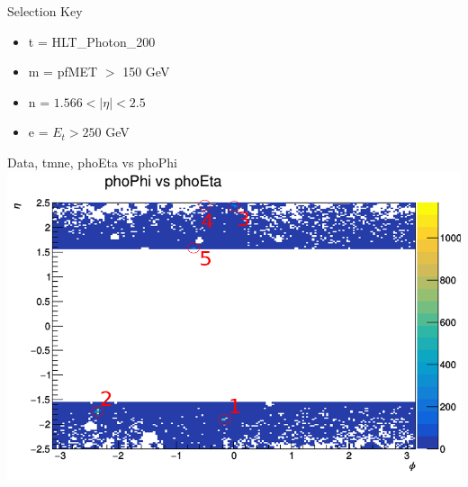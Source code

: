 \documentclass{beamer}
\author{Reese Petersen}
\institute[]{University of Minnesota \\
\medskip
\texttt{pet00831@umn.edu} %
}
\date{\today} %
\title[UMN-CMS Group Meeting]{}
\begin{document}
\begin{frame}{Selection Key}
    \begin{itemize}
        \item t = HLT\_Photon\_200
        \item m = pfMET \(>\) 150 GeV
        \item n = \(1.566<|\eta|<2.5\)
        \item e = \(E_t>250\) GeV
    \end{itemize}
\end{frame}
\begin{frame}{Data, tmne, phoEta vs phoPhi}
    \includegraphics[width=\linewidth]{phoPhi_vs_phoEta_anTGCtree_data_tmne_circles.png}
\end{frame}
\end{document}
